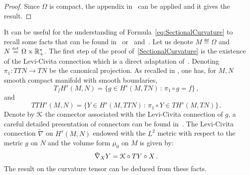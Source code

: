\begin{proof}
Since $\Omega$ is compact, the appendix in~\cite{freed1989} can be applied and it gives the result.
\end{proof}

\begin{remark}
It can be useful for the understanding of Formula~\eqref{eq:SectionalCurvature} to recall some facts that can be found in~\cite{em70} or~\cite{MisiolekCurvature} and~\cite{freed1989}.
Let us denote $M\eqdef \Omega$ and $N \stackrel{\mbox{\upshape\tiny def.}}{=} \Omega \times \mathbb{R}_+^*$. 
The first step of the proof of~\ref{SectionalCurvature} is the existence of the Levi-Civita connection which is a direct adaptation of~\cite[Section 9]{em70}. Denoting $\pi_1: TTN \to TN$ be the canonical projection.  As recalled in \cite[Section 2]{em70}, one has, for $M,N$ smooth compact manifold with smooth boundaries,
\begin{equation*}
T_fH^s(M,N) = \{  g \in H^s(M,TN) \, : \, \pi_1 \circ g = f\}\,,
\end{equation*}
and
\begin{equation*}
TTH^s(M,N) = \{  Y \in H^s(M,TTN) \, : \, \pi_1 \circ Y \in TH^s(M,TN)\}\,.
\end{equation*}
Denote by $\mathcal{K}$ the connector associated with the Levi-Civita connection of $g$, a careful detailed presentation of connectors can be found in~\cite{ArthurBesse2}.
The Levi-Civita connection $\tilde \nabla$ on $H^s(M, N)$ endowed with the $L^2$ metric with respect to the metric $g$ on $N$ and the volume form $\mu_0$ on $M$ is given by:
\begin{equation}
\tilde \nabla_X Y = \mathcal{K} \circ TY \circ X\,.
\end{equation}
The result on the curvature tensor can be deduced from these facts. 
\end{remark}
%
%



